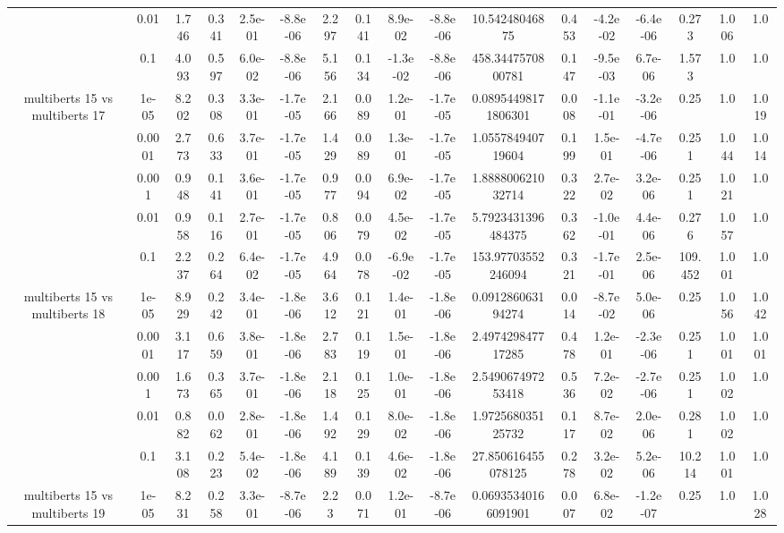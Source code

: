 \begin{tabular}{|c|c|c|c|c|c|c|c|c|c|c|c|c|c|c|c|c|}
 & 0.01 & 1.746 & 0.341 & 2.5e-01 & -8.8e-06 & 2.297 & 0.141 & 8.9e-02 & -8.8e-06 & 10.54248046875 & 0.453 & -4.2e-02 & -6.4e-06 & 0.273 & 1.006 & 1.0 \\
 & 0.1 & 4.093 & 0.597 & 6.0e-02 & -8.8e-06 & 5.156 & 0.134 & -1.3e-02 & -8.8e-06 & 458.3447570800781 & 0.147 & -9.5e-03 & 6.7e-06 & 1.573 & 1.0 & 1.0 \\
\hline
\multirow{5}{*}{multiberts 15 vs multiberts 17} & 1e-05 & 8.202 & 0.308 & 3.3e-01 & -1.7e-05 & 2.166 & 0.089 & 1.2e-01 & -1.7e-05 & 0.08954498171806301 & 0.008 & -1.1e-01 & -3.2e-06 & 0.25 & 1.0 & 1.019 \\
 & 0.0001 & 2.773 & 0.633 & 3.7e-01 & -1.7e-05 & 1.429 & 0.089 & 1.3e-01 & -1.7e-05 & 1.055784940719604 & 0.199 & 1.5e-01 & -4.7e-06 & 0.251 & 1.044 & 1.014 \\
 & 0.001 & 0.948 & 0.141 & 3.6e-01 & -1.7e-05 & 0.977 & 0.094 & 6.9e-02 & -1.7e-05 & 1.888800621032714 & 0.322 & 2.7e-02 & 3.2e-06 & 0.251 & 1.021 & 1.0 \\
 & 0.01 & 0.958 & 0.116 & 2.7e-01 & -1.7e-05 & 0.806 & 0.079 & 4.5e-02 & -1.7e-05 & 5.7923431396484375 & 0.362 & -1.0e-01 & 4.4e-06 & 0.276 & 1.057 & 1.0 \\
 & 0.1 & 2.237 & 0.264 & 6.4e-02 & -1.7e-05 & 4.964 & 0.078 & -6.9e-02 & -1.7e-05 & 153.97703552246094 & 0.321 & -1.7e-01 & 2.5e-06 & 109.452 & 1.001 & 1.0 \\
\hline
\multirow{5}{*}{multiberts 15 vs multiberts 18} & 1e-05 & 8.929 & 0.242 & 3.4e-01 & -1.8e-06 & 3.612 & 0.121 & 1.4e-01 & -1.8e-06 & 0.091286063194274 & 0.014 & -8.7e-02 & 5.0e-06 & 0.25 & 1.056 & 1.042 \\
 & 0.0001 & 3.117 & 0.659 & 3.8e-01 & -1.8e-06 & 2.783 & 0.119 & 1.5e-01 & -1.8e-06 & 2.497429847717285 & 0.478 & 1.2e-01 & -2.3e-06 & 0.251 & 1.001 & 1.001 \\
 & 0.001 & 1.673 & 0.365 & 3.7e-01 & -1.8e-06 & 2.118 & 0.125 & 1.0e-01 & -1.8e-06 & 2.549067497253418 & 0.536 & 7.2e-02 & -2.7e-06 & 0.251 & 1.002 & 1.0 \\
 & 0.01 & 0.882 & 0.062 & 2.8e-01 & -1.8e-06 & 1.492 & 0.129 & 8.0e-02 & -1.8e-06 & 1.972568035125732 & 0.117 & 8.7e-02 & 2.0e-06 & 0.281 & 1.002 & 1.0 \\
 & 0.1 & 3.108 & 0.223 & 5.4e-02 & -1.8e-06 & 4.189 & 0.139 & 4.6e-02 & -1.8e-06 & 27.850616455078125 & 0.278 & 3.2e-02 & 5.2e-06 & 10.214 & 1.001 & 1.0 \\
\hline
\multirow{5}{*}{multiberts 15 vs multiberts 19} & 1e-05 & 8.231 & 0.258 & 3.3e-01 & -8.7e-06 & 2.23 & 0.071 & 1.2e-01 & -8.7e-06 & 0.06935340166091901 & 0.007 & 6.8e-02 & -1.2e-07 & 0.25 & 1.0 & 1.028 \\

\end{tabular}
